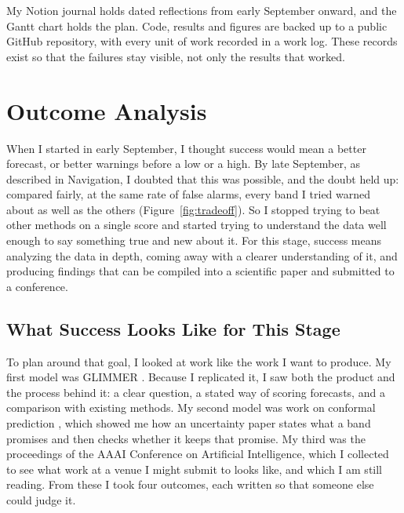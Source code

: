 My Notion journal holds dated reflections from early September onward, and the Gantt chart holds the plan. Code, results and figures are backed up to a public GitHub repository, with every unit of work recorded in a work log. These records exist so that the failures stay visible, not only the results that worked.

\section{Outcome Analysis}

When I started in early September, I thought success would mean a better forecast, or better warnings before a low or a high. By late September, as described in Navigation, I doubted that this was possible, and the doubt held up: compared fairly, at the same rate of false alarms, every band I tried warned about as well as the others (Figure~\ref{fig:tradeoff}). So I stopped trying to beat other methods on a single score and started trying to understand the data well enough to say something true and new about it. For this stage, success means analyzing the data in depth, coming away with a clearer understanding of it, and producing findings that can be compiled into a scientific paper and submitted to a conference.

\subsection{What Success Looks Like for This Stage}

To plan around that goal, I looked at work like the work I want to produce. My first model was GLIMMER \parencite{glimmer2026}. Because I replicated it, I saw both the product and the process behind it: a clear question, a stated way of scoring forecasts, and a comparison with existing methods. My second model was work on conformal prediction \parencite{vovk2005alrw, romano2019cqr}, which showed me how an uncertainty paper states what a band promises and then checks whether it keeps that promise. My third was the proceedings of the AAAI Conference on Artificial Intelligence, which I collected to see what work at a venue I might submit to looks like, and which I am still reading. From these I took four outcomes, each written so that someone else could judge it. 

